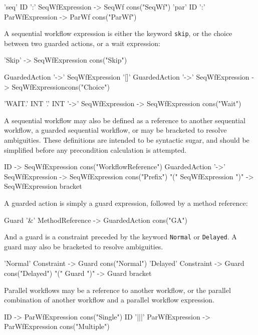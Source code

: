 \begin{code}
'seq' ID ':' SeqWfExpression -> SeqWf {cons("SeqWf")}
'par' ID ':' ParWfExpression -> ParWf {cons("ParWf")}
\end{code}

A sequential workflow expression is either the keyword \verb|skip|, or
the choice between two guarded actions, or a wait expression:
\begin{code}
'Skip'                                   -> SeqWfExpression {cons("Skip")}

GuardedAction '->' SeqWfExpression
'[]' 
GuardedAction '->' SeqWfExpression       -> SeqWfExpression{cons("Choice")}

'WAIT.' INT '.' INT '->' SeqWfExpression -> SeqWfExpression {cons("Wait")}
\end{code}

A sequential workflow may also be defined as a reference to another
sequential workflow, a guarded sequential workflow, or may be
bracketed to resolve ambiguities.  These definitions are intended to
be syntactic sugar, and should be simplified before any precondition
calculation is attempted.

\begin{code}
ID				   -> SeqWfExpression {cons("WorkflowReference")}  
GuardedAction '->' SeqWfExpression -> SeqWfExpression {cons("Prefix")}
"(" SeqWfExpression ")" 	   -> SeqWfExpression {bracket}
\end{code}

A guarded action is simply a guard expression, followed by a method
reference:

\begin{code}
Guard '&' MethodReference -> GuardedAction {cons("GA")}
\end{code}

And a guard is a constraint preceded by the keyword \verb|Normal| or
\verb|Delayed|.  A guard may also be bracketed to resolve ambiguities.

\begin{code}
'Normal' Constraint  -> Guard {cons("Normal")}
'Delayed' Constraint -> Guard {cons("Delayed")}
"(" Guard ")"        -> Guard {bracket}
\end{code}  

Parallel workflows may be a reference to another workflow, or the
parallel combination of another workflow and a parallel workflow
expression.

\begin{code}    
ID			 -> ParWfExpression {cons("Single")}
ID '|||' ParWfExpression -> ParWfExpression {cons("Multiple")}
\end{code}

